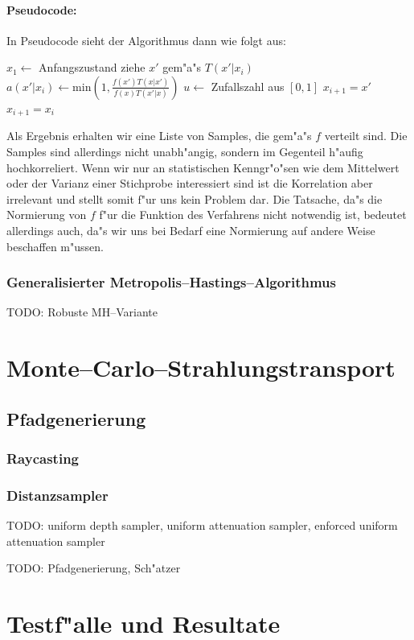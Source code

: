 \documentclass[11pt,a4paper,DIVcalc,BCOR8mm,titlepage,twoside]{scrartcl}
\begin{document}
	\paragraph{Pseudocode:}
	In Pseudocode sieht der Algorithmus dann wie folgt aus:
	\begin{algorithmic}
		\STATE $x_1 \leftarrow$ Anfangszustand
			\STATE ziehe $x'$ gem"a"s $T(x'|x_i)$
			\STATE $a(x'|x_i) \leftarrow \text{min}\left(1, \frac{f(x')T(x|x')}{f(x)T(x'|x)}\right)$
			\STATE $u\leftarrow$ Zufallszahl aus $[0,1]$
				\STATE $x_{i+1}=x'$
			\ELSE	\STATE $x_{i+1}=x_i$
			\ENDIF
	  \ENDFOR
	\end{algorithmic}
	Als Ergebnis erhalten wir eine Liste von Samples, die gem"a"s $f$ verteilt sind. Die Samples sind allerdings nicht unabh"angig, sondern im Gegenteil h"aufig hochkorreliert. Wenn wir nur an statistischen Kenngr"o"sen wie dem Mittelwert oder der Varianz einer Stichprobe interessiert sind ist die Korrelation aber irrelevant und stellt somit f"ur uns kein Problem dar. Die Tatsache, da"s die Normierung von $f$ f"ur die Funktion des Verfahrens nicht notwendig ist, bedeutet allerdings auch, da"s wir uns bei Bedarf eine Normierung auf andere Weise beschaffen m"ussen.
	
	
	\subsubsection{Generalisierter Metropolis--Hastings--Algorithmus}
	TODO: Robuste MH--Variante

	\section{Monte--Carlo--Strahlungstransport}
	\subsection{Pfadgenerierung}
	\subsubsection{Raycasting}
	\subsubsection{Distanzsampler}
	TODO: uniform depth sampler, uniform attenuation sampler, enforced uniform attenuation sampler
	
	TODO: Pfadgenerierung, Sch"atzer
	
	\section{Testf"alle und Resultate}
\end{document}

